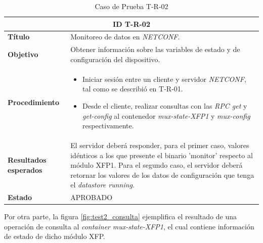   \begin{table}[H]
    \centering
    \begin{tabular}{ |m{2.5cm}|m{11cm}|  }
    \hline
    \multicolumn{2}{|c|}{ \textbf{ID T-R-02} } \\
    \hline
    \centering
    \textbf{Título} & Monitoreo de datos en \textit{NETCONF}. \\
    \hline
    \centering
    \textbf{Objetivo} & Obtener información sobre las variables de estado y de configuración del dispositivo.  \\
    \hline
    \centering
    \textbf{Procedimiento} & \begin{itemize}
      \item Iniciar sesión entre un cliente y servidor \textit{NETCONF}, tal como se describió en T-R-01.   
      \item Desde el cliente, realizar consultas con las \textit{RPC get} y \textit{get-config} al contenedor \textit{mux-state-XFP1} y \textit{mux-config} respectivamente.
    \end{itemize}     \\

    \hline
    \centering
    \textbf{Resultados esperados} & 
    El servidor deberá responder, para el primer caso, valores idénticos a los que presente el binario 'monitor' respecto al módulo XFP1. 
Para el segundo caso, el servidor deberá retornar los valores de los datos de configuración que tenga el \textit{datastore running}.
\\
    
      \hline
    \centering
      \textbf{Estado}    & APROBADO  \\
    \hline
    \end{tabular}
    
    \caption{Caso de Prueba T-R-02}
    \label{tab:TR02}
    \end{table}

  Por otra parte, la figura \ref{fig:test2_consulta} ejemplifica el resultado de una operación de consulta al \textit{container} \textit{mux-state-XFP1}, el cual contiene información de estado de dicho módulo XFP.

